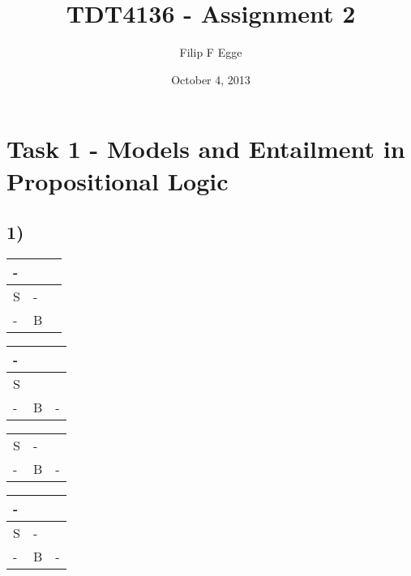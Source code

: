 \documentclass{article}
\newcommand{\wombat}{\cellcolor{newred}}
\begin{document}
\title{TDT4136 - Assignment 2}
\author{Filip F Egge}
\date{October 4, 2013}
\maketitle

\newpage
\section*{Task 1 - Models and Entailment in Propositional Logic}
\subsection*{1)}
	\begin{center}
		\begin{tabular}{|m{0.25cm}|m{0.25cm}|m{0.25cm}|}
			\hline
			- &&  \\ \hline
			S & - &\\ \hline
			- & B & \wombat \\ \hline
		\end{tabular}
		\quad
		\begin{tabular}{|m{0.25cm}|m{0.25cm}|m{0.25cm}|}
			\hline
			- &&  \\ \hline
			S & \wombat & \\ \hline
			- & B & - \\ \hline
		\end{tabular}
		\quad
		\begin{tabular}{|m{0.25cm}|m{0.25cm}|m{0.25cm}|}
			\hline
			\wombat &&  \\ \hline
			S & - & \\ \hline
			- & B & - \\ \hline
		\end{tabular}
		\quad
		\begin{tabular}{|m{0.25cm}|m{0.25cm}|m{0.25cm}|}
			\hline
			- &&  \\ \hline
			S & - & \\ \hline
			- & B & - \\ \hline
		\end{tabular}
	\end{center}
\end{document}
